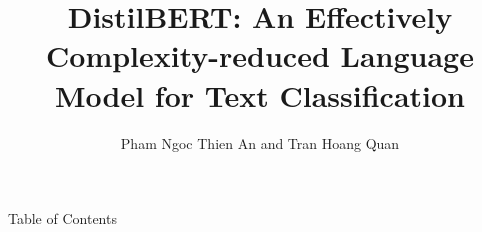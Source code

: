\documentclass[12pt, aspectratio=149]{beamer}
\title[DistilBERT for Text Classification]{DistilBERT: An Effectively Complexity-reduced Language Model for Text Classification}
\author[PNTAn and THQuan]{Pham Ngoc Thien An and Tran Hoang Quan}
\institute[fit@hcmus]{VNUHCM - University of Science}
\begin{document}
\maketitle

\begin{frame}{Table of Contents}
\tableofcontents
\end{frame}









\end{document}
